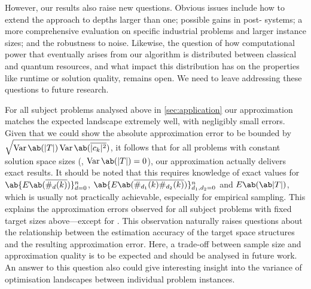 However, our results also raise new questions.
Obvious issues include how to extend the approach
to \QAOA depths larger than one;  possible gains in post-\NISQ
systems; a more comprehensive evaluation on specific
industrial problems and larger instance sizes; and the
robustness to noise. Likewise, the question of how computational 
power that eventually arises from our algorithm is distributed 
between classical and quantum resources, and what impact this 
distribution has on the properties like runtime or solution 
quality, remains open. We need to leave addressing these
questions to future research.

For all subject problems analysed above in \cref{sec:application} 
our approximation matches the expected landscape extremely well, 
with negligibly small errors. Given that we could show the absolute 
approximation error to be bounded by $\sqrt{\Var\ab(|T|) 
\Var\ab(\overline{|c_k|^2})}$, it follows that for all problems with 
constant solution space sizes (\ie, $\Var\ab(|T|) = 0$), our 
approximation actually delivers exact results. It should be noted that this  
requires knowledge of exact values for 
$\ab\{E\ab(\overline{\#_d (k)})\}_{d=0}^n$, $\ab\{E\ab(\overline{\#_{d_1} (k) \#_{d_2} (k)})\}_{d_1, d_2 = 0}^n$ and $E\ab(\ab|T|)$, 
which is usually not practically achievable, especially for 
empirical sampling. This explains the approximation errors observed 
for all subject problems with fixed target sizes above---except for \SAT. This 
observation naturally raises questions about the relationship 
between the estimation accuracy of the target space structures and 
the resulting approximation error. Here, a trade-off between sample 
size and approximation quality is to be expected and should be 
analysed in future work. An answer to this question also could give 
interesting insight into the variance of optimisation landscapes 
between individual problem instances.

